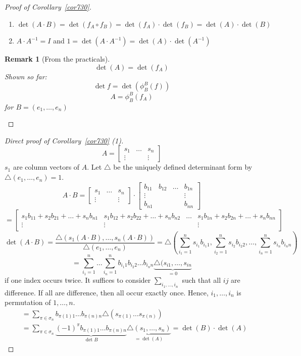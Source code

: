 \documentclass{article}
\newtheorem{remark}{Remark}  \numberwithin{remark}{section}
\begin{document}
\begin{proof}[Proof of Corollary~\ref{cor730}]
  \begin{enumerate}
    \item $\det(A \cdot B) = \det(f_A \circ f_B) = \det(f_A) \cdot \det(f_B) = \det(A) \cdot \det(B)$
    \item $A \cdot A^{-1} = I$ and $1 = \det(A \cdot A^{-1}) = \det(A) \cdot \det(A^{-1})$
  \end{enumerate}
  \begin{remark}[From the practicals]
    \[ \det(A) = \det(f_A) \]
    Shown so far:
    \[ \det{f} = \det\left(\phi_B^B(f)\right) \]
    \[ A = \phi_B^B\left(f_A\right) \]
    for $B = (e_1, \dots, e_n)$
  \end{remark}
\end{proof}

\begin{proof}[Direct proof of Corollary~\ref{cor730} (1)]
  \[ A = \begin{bmatrix} s_1 & \dots & s_n \\ \vdots &  & \vdots \end{bmatrix} \]
  $s_1$ are column vectors of $A$.
  Let $\triangle$ be the uniquely defined determinant form by $\triangle(e_1, \dots, e_n) = 1$.
  \[
    A \cdot B
    = \begin{bmatrix} s_1 & \dots & s_n \\ \vdots &  & \vdots \end{bmatrix} \cdot \begin{bmatrix} b_{11} & b_{12} & \dots & b_{1n} \\ \vdots & & & \vdots \\ b_{n1} & & & b_{nn} \end{bmatrix}
  \] \[
    = \begin{bmatrix} s_1 b_{11} + s_2 b_{21} + \dots + s_n b_{n1} & s_1 b_{12} + s_2 b_{22} + \dots + s_n b_{n2} & \dots & s_1 b_{1n} + s_2 b_{2n} + \dots + s_n b_{nn} \\
    \vdots & \vdots &  & \vdots \end{bmatrix}
  \] \[
    \det(A \cdot B) = \frac{\triangle(s_1(A \cdot B), \dots, s_n(A \cdot B))}{\triangle (e_1, \dots, e_n)}
      = \triangle\left(\sum_{i_1=1}^n s_{i_1} b_{i_1 1}, \sum_{i_2=1}^n s_{i_2} b_{i_2 2}, \dots, \sum_{i_n=1}^n s_{i_n} b_{i_n n}\right)
  \] \[
    = \sum_{i_1=1}^n \dots \sum_{i_n=1}^n b_{i_1 1} b_{i_2 2} \dots b_{i_n n} \underbrace{\triangle(s_{i1}, \dots, s_{in}}_{=0}
  \]
  if one index occurs twice. It suffices to consider $\sum_{i_1,\dots,i_n}$ such that all $ij$ are difference.
  If all are difference, then all occur exactly once. Hence,
  $i_1,\dots,i_n$ is permutation of $1, \dots, n$.
  \begin{align*}
    &= \sum_{\pi \in \sigma_n} b_{\pi(1) 1} \dots b_{\pi(n) n} \triangle(s_{\pi(1)} \dots s_{\pi(n)}) \\
    &= \sum_{\pi \in \sigma_n} \underbrace{(-1)^\pi b_{\pi(1) 1} \dots b_{\pi(n) n}}_{\det{B}} \underbrace{\triangle(s_1, \dots, s_n)}_{= \det(A)} = \det(B) \cdot \det(A)
  \end{align*}
\end{proof}
\end{document}
